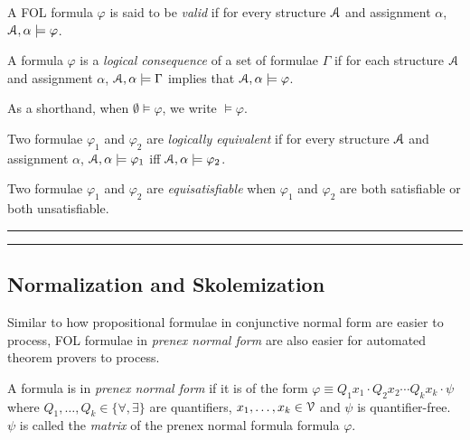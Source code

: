 \documentclass[11pt,usenames, dvipsnames]{article}
\begin{document}
\begin{definition}[Validity]
  A FOL formula $\varphi$ is said to be \emph{valid} if for every structure $\struct$ and assignment $\alpha$, $\struct, \alpha \models \varphi$.
\end{definition}

\begin{definition}
  A formula $\varphi$ is a \emph{logical consequence} of a set of formulae $\Gamma$ if for each structure $\struct$ and assignment $\alpha$, $\struct, \alpha \models \Gamma$ implies that $\struct, \alpha \models \varphi$.

  As a shorthand, when $\emptyset \models \varphi$, we write $\models \varphi$.
\end{definition}

\begin{definition}
  Two formulae $\varphi_1$ and $\varphi_2$ are \emph{logically equivalent} if for every structure $\struct$ and assignment $\alpha$, $\struct, \alpha \models \varphi_1$ iff $\struct, \alpha \models \varphi_2$.
\end{definition}

\begin{definition}[Equisatisfiability]
  Two formulae $\varphi_1$ and $\varphi_2$ are \emph{equisatisfiable} when $\varphi_1$ and $\varphi_2$ are both satisfiable or both unsatisfiable.
\end{definition}

\vspace{5truemm}
\hrule
\hrule

\subsection{\large \centering Normalization and Skolemization}
\noindent

Similar to how propositional formulae in conjunctive normal form are easier to process, FOL formulae in \emph{prenex normal form} are also easier for automated theorem provers to process.

\begin{definition}
  A formula is in \emph{prenex normal form} if it is of the form $\varphi \equiv Q_1x_1 \cdot Q_2x_2 \cdots Q_kx_k \cdot \psi$ where $Q_1, \ldots, Q_k \in \{ \forall, \exists \}$ are quantifiers, $x_1, \ldots, x_k \in \vars$ and $\psi$ is quantifier-free. $\psi$ is called the \emph{matrix} of the prenex normal formula formula $\varphi$.
\end{definition}
\end{document}
